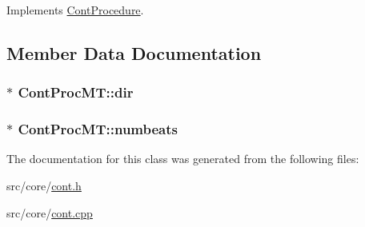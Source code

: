Implements \hyperlink{a00067_a7f7adefe250a00b3778669ef649f03ac}{Cont\-Procedure}.



\subsection{Member Data Documentation}
\hypertarget{a00078_a912c5f4ac526d2111c72a1c67c041546}{
\subsubsection[{dir}]{ $\ast$ Cont\-Proc\-M\-T\-::dir\hspace{0.3cm}{\ttfamily [private]}}}\label{a00078_a912c5f4ac526d2111c72a1c67c041546}
\hypertarget{a00078_a5a82bf27f6fb31379f6cdabcc4c5c8a9}{
\subsubsection[{numbeats}]{$\ast$ Cont\-Proc\-M\-T\-::numbeats\hspace{0.3cm}{\ttfamily [private]}}}\label{a00078_a5a82bf27f6fb31379f6cdabcc4c5c8a9}


The documentation for this class was generated from the following files\-:\begin{DoxyCompactItemize}
\item 
src/core/\hyperlink{a00218}{cont.\-h}\item 
src/core/\hyperlink{a00217}{cont.\-cpp}\end{DoxyCompactItemize}
